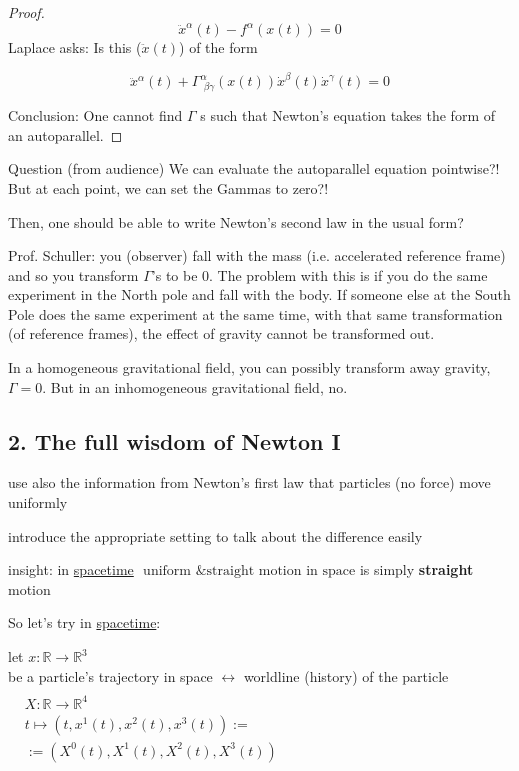 \documentclass[10pt]{amsart}
\begin{document}
\begin{multicols*}{2}
\begin{proof}
		\[
		\ddot{x}^{\alpha}(t) - f^{\alpha}(x(t)) = 0 
		\]
		Laplace asks: Is this ($\ddot{x}(t)$) of the form 
		
		\[
		\ddot{x}^{\alpha}(t) + \Gamma^{\alpha}_{\, \, \beta \gamma}(x(t)) \dot{x}^{\beta}(t) \dot{x}^{\gamma}(t) = 0 
		\]
		
		Conclusion: One cannot find $\Gamma$ s such that Newton's equation takes the form of an autoparallel.
		
	\end{proof}
	
	Question (from audience) We can evaluate the autoparallel equation pointwise?! But at each point, we can set the Gammas to zero?!
	
	Then, one should be able to write Newton's second law in the usual form?
	
	Prof. Schuller: you (observer) fall with the mass (i.e. accelerated reference frame) and so you transform $\Gamma$'s to be $0$.  The problem with this is if you do the same experiment in the North pole and fall with the body.  If someone else at the South Pole does the same experiment at the same time, with that same transformation (of reference frames), the effect of gravity cannot be transformed out.
	
	In a homogeneous gravitational field, you can possibly transform away gravity, $\Gamma=0$.  But in an inhomogeneous gravitational field, no.
	
	\subsection*{2. The full wisdom of Newton I}
	
	use also the information from Newton's first law that particles (no force) move uniformly 
	
	introduce the appropriate setting to talk about the difference easily
	
	insight: in \underline{spacetime} $\boxed{ \text{ uniform \& straight motion in space}}$ is simply \textbf{straight} motion
	
	So let's try in \underline{spacetime}: 
	
	let $x: \mathbb{R} \to \mathbb{R}^3$ \\
	\phantom{\quad } be a particle's trajectory in space $\longleftrightarrow $ worldline (history) of the particle $\begin{aligned} & \quad \\
	& X : \mathbb{R} \to \mathbb{R}^4  \\
	& t\mapsto (t, x^1(t), x^2(t),x^3(t)) := \\
	& := (X^0(t), X^1(t),X^2(t),X^3(t)) \end{aligned}$
	

\end{multicols*}
\end{document}
